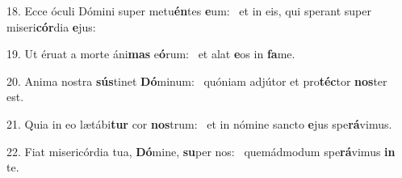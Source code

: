 18. Ecce óculi Dómini super metu\textbf{én}tes \textbf{e}um: \ast\  et in eis, qui sperant super miseri\textbf{cór}dia \textbf{e}jus:\

19. Ut éruat a morte áni\textbf{mas} e\textbf{ó}rum: \ast\  et alat \textbf{e}os in \textbf{fa}me.\

20. Anima nostra \textbf{sús}tinet \textbf{Dó}minum: \ast\  quóniam adjútor et pro\textbf{téc}tor \textbf{nos}ter est.\

21. Quia in eo lætábi\textbf{tur} cor \textbf{nos}trum: \ast\  et in nómine sancto \textbf{e}jus spe\textbf{rá}vimus.\

22. Fiat misericórdia tua, \textbf{Dó}mine, \textbf{su}per nos: \ast\  quemádmodum spe\textbf{rá}vimus \textbf{in} te.\

